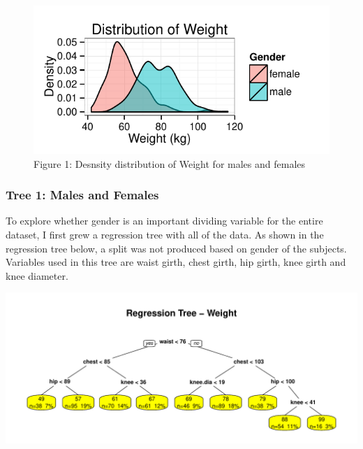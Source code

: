 \documentclass[11pt]{article}\usepackage[]{graphicx}\usepackage[]{color}
\makeatletter
\def\maxwidth{ %
  \ifdim\Gin@nat@width>\linewidth
    \linewidth
  \else
    \Gin@nat@width
  \fi
}
\newenvironment{knitrout}{}{} %
\makeatother
\begin{document}
\begin{center}
\begin{figure}
\begin{knitrout}
\color{fgcolor}
\includegraphics[width=\maxwidth]{figure/wdt} 

\end{knitrout}

\vspace{-10pt}
\caption{Figure 1: Desnsity distribution of Weight for males and females}
\end{figure}
\end{center}

\subsubsection{Tree 1: Males and Females} 
To explore whether gender is an important dividing variable for the entire dataset, I first grew a regression tree with all of the data. As shown in the regression tree below, a split was not produced based on gender of the subjects. Variables used in this tree are waist girth, chest girth, hip girth, knee girth and knee diameter.

\begin{knitrout}
\color{fgcolor}
\includegraphics[width=\maxwidth]{figure/wt} 

\end{knitrout}
\end{document}
